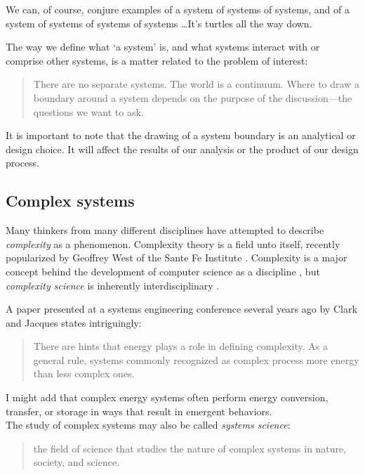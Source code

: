 \documentclass[10pt]{article}
\begin{document}
We can, of course, conjure examples of a system of systems of systems, and of a system of systems of systems of systems \ldots It's turtles all the way down.

The way we define what `a system' is, and what systems interact with or comprise other systems, is a matter related to the problem of interest:

\begin{quote}
    There are no separate systems. The world is a continuum. Where to draw a boundary around a system depends on the purpose of the discussion---the questions we want to ask. \cite{Donella_H_Meadows2016-nq}
\end{quote}

It is important to note that the drawing of a system boundary is an analytical or design choice. It will affect the results of our analysis or the product of our design process.

\subsection{Complex systems}

Many thinkers from many different disciplines have attempted to describe \textit{complexity} as a phenomenon. Complexity theory is a field unto itself, recently popularized by Geoffrey West of the Sante Fe Institute \cite{scale}. Complexity is a major concept behind the development of computer science as a discipline \cite{Hartmanis1994-sq}, but \textit{complexity science} is inherently interdisciplinary \cite{Downey2012-ce}.

A paper presented at a systems engineering conference several years ago by Clark and Jacques states intriguingly:

\begin{quote}
There are hints that energy plays a role in defining complexity. As a general rule, systems commonly  recognized as complex process more energy than less complex ones. \cite{Clark2012-bm}
\end{quote}

I might add that complex energy systems often perform energy conversion, transfer, or storage in ways that result in emergent behaviors.\\

The study of complex systems may also be called \textit{systems science}: \begin{quote}
    the field of science that studies the nature of complex systems in nature, society, and science. \cite{noauthor_undated-rd}
\end{quote}
\end{document}
